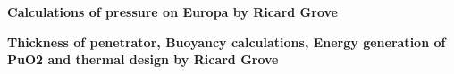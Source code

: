 \label{app:ricard}

\textbf{Calculations of pressure on Europa by Ricard Grove}


\newpage
\noindent
\textbf{Thickness of penetrator, Buoyancy calculations, Energy generation of PuO2 and thermal design by Ricard Grove}

